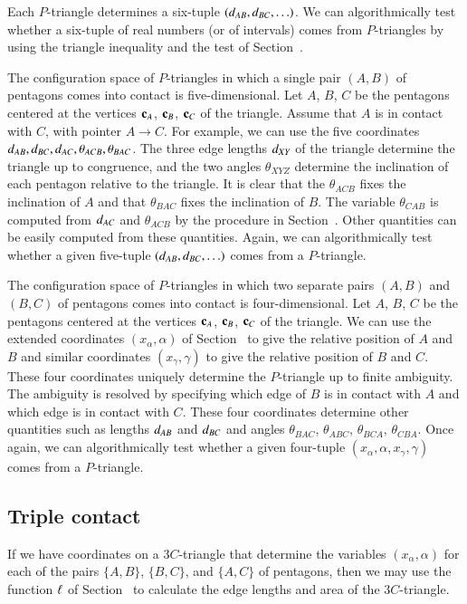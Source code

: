 Each $P$-triangle determines a six-tuple $(d_{AB},d_{BC},\ldots)$.
We can algorithmically test whether a six-tuple of real numbers (or of
intervals) comes from $P$-triangles by using the triangle inequality
and the test of Section~.

The configuration space of $P$-triangles in which a single pair
$(A,B)$ of pentagons comes into contact is five-dimensional.  Let $A$,
$B$, $C$ be the pentagons centered at the vertices ${\mathbf c}_A$, ${\mathbf c}_B$,
${\mathbf c}_C$ of the triangle.  Assume that $A$ is in contact with $C$, with
pointer $A\to C$.  For example, we can use the five coordinates
$d_{AB},d_{BC},d_{AC},\theta_{ACB},\theta_{BAC}$.  The three edge
lengths $d_{XY}$ of the triangle determine the triangle up to
congruence, and the two angles $\theta_{XYZ}$ determine the
inclination of each pentagon relative to the triangle.  It is clear
that the $\theta_{ACB}$ fixes the inclination of $A$ and that
$\theta_{BAC}$ fixes the inclination of $B$.  The variable
$\theta_{CAB}$ is computed from $d_{AC}$ and $\theta_{ACB}$ by the
procedure in Section~.  Other quantities can be easily
computed from these quantities. Again, we can algorithmically
test whether a given five-tuple $(d_{AB},d_{BC},\ldots)$ 
comes from a $P$-triangle.

The configuration space of $P$-triangles in which two separate pairs
$(A,B)$ and $(B,C)$ of pentagons comes into contact is
four-dimensional.  Let $A$, $B$, $C$ be the pentagons centered at the
vertices ${\mathbf c}_A$, ${\mathbf c}_B$, ${\mathbf c}_C$ of the triangle.  We can use the
extended coordinates $(x_\alpha,\alpha)$ of Section~
to give the relative position of $A$ and $B$ and similar coordinates
$(x_\gamma,\gamma)$ to give the relative position of $B$ and $C$.
These four coordinates uniquely determine the $P$-triangle up to
finite ambiguity.  The ambiguity is resolved by specifying which edge
of $B$ is in contact with $A$ and which edge is in contact with $C$.
These four coordinates determine other quantities such as lengths
$d_{AB}$ and $d_{BC}$ and angles $\theta_{BAC}$, $\theta_{ABC}$,
$\theta_{BCA}$, $\theta_{CBA}$.  Once again, we can algorithmically
test whether a given four-tuple $(x_\alpha,\alpha,x_\gamma,\gamma)$
comes from a $P$-triangle.

\subsection{Triple contact}

If we have coordinates on a $3C$-triangle that determine the variables
$(x_\alpha,\alpha)$ for each of the pairs $\{A,B\}$, $\{B,C\}$, and
$\{A,C\}$ of pentagons, then we may use the function $\ell$ of
Section~ to calculate the edge lengths and area of the
$3C$-triangle.

